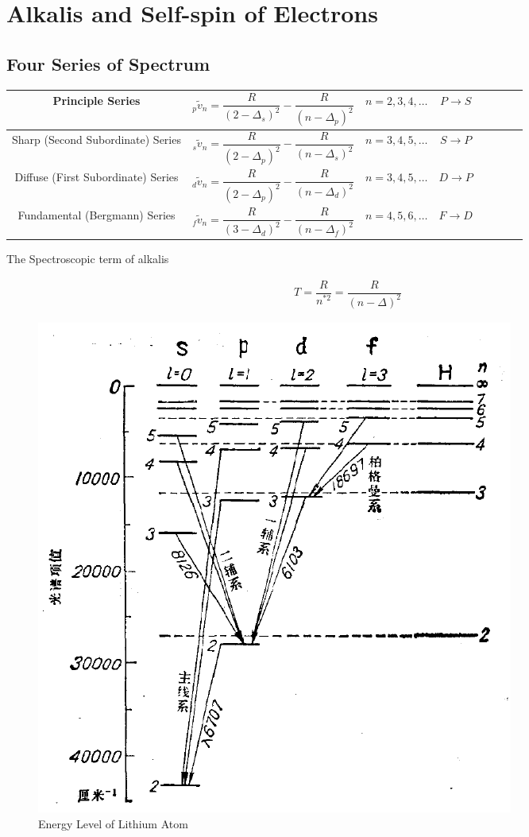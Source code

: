 \chapter{Alkalis and Self-spin of Electrons}

\section{Four Series of Spectrum}

\begin{table}[h]
  \centering
  \begin{tabular}{|Sc|Sc|Sc|Sc|}
    \hline
    Principle Series & ${}_p\tilde{v}_n = \dfrac{R}{\left( 2 - \Delta_s \right)^2} - \dfrac{R}{\left( n - \Delta_p \right)^2}  $& $n = 2,3,4,\dots$ & $P \rightarrow S$\\
    \hline
    Sharp (Second Subordinate) Series & ${}_s\tilde{v}_n = \dfrac{R}{\left( 2 - \Delta_p \right)^2} - \dfrac{R}{\left( n - \Delta_s \right)^2}  $& $n = 3,4,5,\dots$ & $S \rightarrow P$\\
    \hline
    Diffuse (First Subordinate) Series & ${}_d\tilde{v}_n = \dfrac{R}{\left( 2 - \Delta_p \right)^2} - \dfrac{R}{\left( n - \Delta_d \right)^2}  $& $n = 3,4,5,\dots$ & $D \rightarrow P$\\
    \hline
    Fundamental (Bergmann) Series & ${}_f\tilde{v}_n = \dfrac{R}{\left( 3 - \Delta_d \right)^2} - \dfrac{R}{\left( n - \Delta_f \right)^2}  $& $n = 4,5,6,\dots$ & $F \rightarrow D$\\
    \hline
  \end{tabular}
\end{table}

The Spectroscopic term of alkalis

\begin{equation}
  \begin{aligned}
    T = \dfrac{R}{n^{*2}} = \dfrac{R}{\left( n - \Delta \right)^2}  
  \end{aligned}
\end{equation}

\begin{figure}[H]
  \centering
  \includegraphics[width=0.4\linewidth]{figures/Energy-Level-Lithium}
  \caption{Energy Level of Lithium Atom}
  \label{fig:}
\end{figure}

